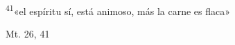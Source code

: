 \documentclass[../../rosario.tex]{subfiles}
\begin{document}
    \textsuperscript{41}«el espíritu sí, está animoso, más la carne es flaca»
    \begin{flushright}
    Mt. 26, 41
    \end{flushright}
\end{document}
